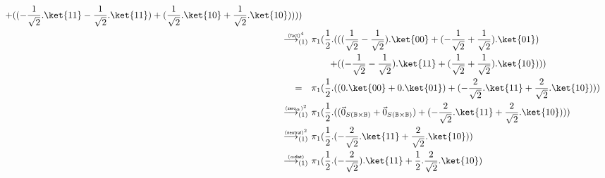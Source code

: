 \documentclass[preprint]{elsarticle}
\newcommand\lra[1][1]{\longrightarrow_{\left(#1\right)}}
\newcommand\B{\ensuremath{\mathbb B}}
\newcommand\pair[2]{({#1}+{#2})}
\newcommand\npair[2]{({#1}-{#2})}
\newcommand\s[1]{\ensuremath{\mathsf{#1}}}
\newcommand\red[2][1]{\overset{\scriptscriptstyle\smash{#2}\vphantom{x}}{\lra[#1]}\ }
\newcommand\z[1][A]{\vec 0_{S(#1)}}
\newcommand\rneut{(\s{neutral})}
\newcommand\rzeros{(\s{zero_\alpha})}
\newcommand\rdists{(\s{\alpha dist})}
\newcommand\rfact{(\s{fact})}
\begin{document}
\begin{align*}
\begin{aligned}[t]
              +& { \pair{ \npair {-\frac 1{\sqrt 2}.\ket{11}} {\frac 1{\sqrt
                      2}.\ket{11}} }{ \pair {\frac 1{\sqrt 2}.\ket{10}} {\frac
                    1{\sqrt 2}.\ket{10}} } } ) )
            \end{aligned}
  \\
  \red{\rfact^4} &
                   \begin{aligned}[t]
                     \pi_1 (\frac 12. ( &{ \pair { \npair {\frac 1{\sqrt 2}}
                         {\frac 1{\sqrt 2}} .\ket{00} }{ \pair {-\frac 1{\sqrt
                             2}} {\frac 1{\sqrt 2}} .\ket{01} }
                     }\\
                     +& { \pair{ \npair {-\frac 1{\sqrt 2}} {\frac 1{\sqrt
                             2}}.\ket{11} }{ \pair {\frac 1{\sqrt 2}} {\frac
                           1{\sqrt 2}}.\ket{10} } } ) )
                   \end{aligned}
  \\
  =\quad &
           \pi_1
           (\frac 12.
           (
           {
           \pair
           {
           0.\ket{00}
           }{
           0.\ket{01}
           }
           }
           +
           {
           \pair{
           {-\frac 2{\sqrt 2}}.\ket{11}
           }{
           {\frac 2{\sqrt 2}}.\ket{10}
           }
           }
           )
           )
  \\
  \red{\rzeros^2} &
                    \pi_1
                    (\frac 12.
                    (
                    {
                    \pair{\z[\B\times\B]}{\z[\B\times\B]}
                    }
                    +
                    {
                    \pair
                    {
                    {-\frac 2{\sqrt 2}}.\ket{11}
                    }
                    {
                    \frac 2{\sqrt 2}.\ket{10}
                    }
                    }
                    )
                    )
  \\
  \red{\rneut^2} &
                   \pi_1
                   (\frac 12.
                   \pair
                   {
                   {-\frac 2{\sqrt 2}}.\ket{11}
                   }
                   {
                   \frac 2{\sqrt 2}.\ket{10}
                   }
                   )
  \\
  \red\rdists &
                \pi_1
                \pair
                {
                {\frac 12.(-\frac 2{\sqrt 2}}).\ket{11}
                }
                {
                \frac 12.\frac 2{\sqrt 2}.\ket{10}
                }
  \\

\end{align*}
\end{document}
